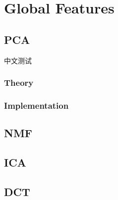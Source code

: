 \chapter{Global Features}


\section{PCA}
中文测试
\subsection{Theory}
\subsection{Implementation}

\section{NMF}

\section{ICA}

\section{DCT}

